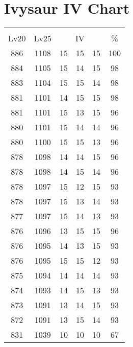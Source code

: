 \documentclass{article}%
\begin{document}
%
\normalsize%
\section{Ivysaur IV Chart}%
\label{sec:Ivysaur IV Chart}%
\renewcommand{\arraystretch}{1.5}%
\begin{tabular}{|c|c|c|c|c|c|}%
\hline%
\multicolumn{6}{|c|}{\textcolor{white}{ 
\linebreak{Ivysaur}
}%
\cellcolor{black}}\\%
\multicolumn{1}{|c}{Lv20}&\multicolumn{1}{c|}{Lv25}&\multicolumn{3}{c|}{IV}&\multicolumn{1}{|c|}{\%}\\%
\hline%
\rowcolor{color100}%
886&1108&15&15&15&100\\%
\hline%
\rowcolor{color98}%
884&1105&15&14&15&98\\%
\hline%
\rowcolor{color98}%
883&1104&15&15&14&98\\%
\hline%
\rowcolor{color98}%
881&1101&14&15&15&98\\%
\hline%
\rowcolor{color96}%
881&1101&15&13&15&96\\%
\hline%
\rowcolor{color96}%
880&1101&15&14&14&96\\%
\hline%
\rowcolor{color96}%
880&1100&15&15&13&96\\%
\hline%
\rowcolor{color96}%
878&1098&14&14&15&96\\%
\hline%
\rowcolor{color96}%
878&1098&14&15&14&96\\%
\hline%
\rowcolor{color93}%
878&1097&15&12&15&93\\%
\hline%
\rowcolor{color93}%
878&1097&15&13&14&93\\%
\hline%
\rowcolor{color93}%
877&1097&15&14&13&93\\%
\hline%
\rowcolor{color96}%
876&1096&13&15&15&96\\%
\hline%
\rowcolor{color93}%
876&1095&14&13&15&93\\%
\hline%
\rowcolor{color93}%
876&1095&15&15&12&93\\%
\hline%
\rowcolor{color93}%
875&1094&14&14&14&93\\%
\hline%
\rowcolor{color93}%
874&1093&14&15&13&93\\%
\hline%
\rowcolor{color93}%
873&1091&13&14&15&93\\%
\hline%
\rowcolor{color93}%
872&1091&13&15&14&93\\%
\hline%
\rowcolor{color91}%
831&1039&10&10&10&67\\%
\end{tabular}

%
\end{document}
